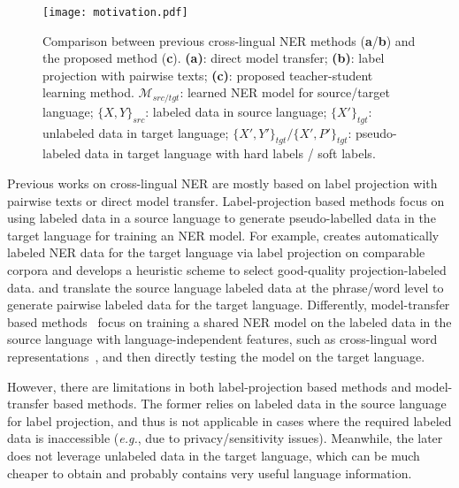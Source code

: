 \documentclass[11pt,a4paper]{article}
\newcommand\eg{\textit{e.g.}}
\begin{document}
	\begin{figure}[t]
		\centering
		\texttt{[image: motivation.pdf]}
		\caption{Comparison between previous cross-lingual NER methods (\textbf{a}/\textbf{b}) and the proposed method (\textbf{c}). \textbf{(a)}: direct model transfer; \textbf{(b)}: label projection with pairwise texts; \textbf{(c)}: proposed teacher-student learning method. 
			$\mathcal{M}_{src/tgt}$: learned NER model for source/target language; $\{X,Y\}_{src}$: labeled data in source language; $\{X'\}_{tgt}$: unlabeled data in target language; $\{X', Y'\}_{tgt}/\{X', P'\}_{tgt}$: pseudo-labeled data in target language with hard labels / soft labels. 
}
		\label{fig:motivation}
	\end{figure}
	
	Previous works on cross-lingual NER are mostly based on label projection with pairwise texts or direct model transfer. Label-projection based methods focus on using labeled data in a source language to generate pseudo-labelled data in the target language for training an NER model. 
	For example, \citet{ni2017weakly} creates automatically labeled NER data for the target language via label projection on comparable corpora and develops a heuristic scheme to select good-quality projection-labeled data.
	\citet{mayhew2017cheap} and \citet{xie2018neural} translate the source language labeled data at the phrase/word level to generate pairwise labeled data for the target language. Differently, model-transfer based methods~\cite{wu2019beto, wu2020enhanced} focus on training a shared NER model on the labeled data in the source language with language-independent features, such as cross-lingual word representations~\cite{devlin2019bert}, and then directly testing the model on the target language.


	However, there are limitations in both label-projection based methods and model-transfer based methods. 
	The former relies on labeled data in the source language for label projection, and thus is not applicable in cases where the required labeled data is inaccessible (\eg, due to privacy/sensitivity issues).  
Meanwhile, the later does not leverage unlabeled data in the target language, which can be much cheaper to obtain and probably contains very useful language information. 
\end{document}

